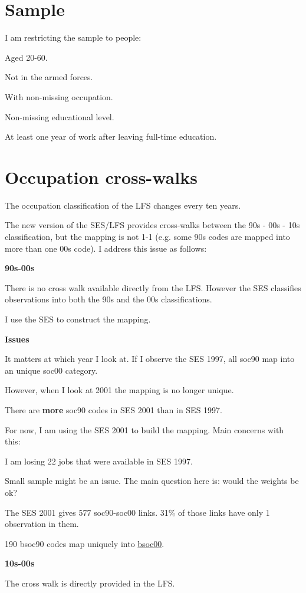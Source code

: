 \documentclass[a4paper, 12pt]{article}
\begin{document}
\section{Sample}
I am restricting the sample to people:
\bitem
	\item Aged 20-60.
	\item Not in the armed forces.
	\item With non-missing occupation.
	\item Non-missing educational level.
	\item At least one year of work after leaving full-time education.
\eitem

\section{Occupation cross-walks}
\bitem
	\item The occupation classification of the LFS changes every ten years.
	\item The new version of the SES/LFS provides cross-walks between the 90s - 00s - 10s classification, but the mapping is not 1-1 (e.g. some 90s codes are mapped into more than one 00s code). I address this issue as follows:
	\item \textbf{90s-00s}
	\bitem
		\item There is no cross walk available directly from the LFS. However the SES classifies observations into both the 90s and the 00s classifications.
		\item I use the SES to construct the mapping.
		\item \textbf{Issues}
		\bitem
			\item It matters at which year I look at. If I observe the SES 1997, all soc90 map into an unique soc00 category.
			\item However, when I look at 2001 the mapping is no longer unique.
			\item There are \textbf{more} soc90 codes in SES 2001 than in SES 1997.
		\eitem
		\item For now, I am using the SES 2001 to build the mapping. Main concerns with this:
		\bitem
			\item I am losing 22 jobs that were available in SES 1997.
			\item Small sample might be an issue. The main question here is: would the weights be ok?
			\item The SES 2001 gives 577 soc90-soc00 links. 31\% of those links have only 1 observation in them.
			\item 190 bsoc90 codes map uniquely into \href{https://www.dropbox.com/s/9a6xgrs32jsneuw/soc90count.txt?dl=0}{bsoc00}.
		\eitem
	\eitem
	\item \textbf{10s-00s}
	\bitem
		\item The cross walk is directly provided in the LFS.
	\eitem
\eitem
\end{document}
